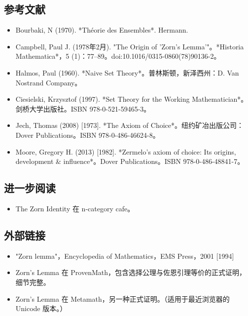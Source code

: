\subsection{参考文献}  
\begin{itemize}
\item Bourbaki, N (1970). *Théorie des Ensembles*. Hermann.  
\item Campbell, Paul J. (1978年2月). "The Origin of 'Zorn's Lemma'"。*Historia Mathematica*，5 (1)：77–89。doi:10.1016/0315-0860(78)90136-2。  
\item Halmos, Paul (1960). *Naive Set Theory*。普林斯顿，新泽西州：D. Van Nostrand Company。  
\item Ciesielski, Krzysztof (1997). *Set Theory for the Working Mathematician*。剑桥大学出版社。ISBN 978-0-521-59465-3。  
\item Jech, Thomas (2008) [1973]. *The Axiom of Choice*。纽约矿冶出版公司：Dover Publications。ISBN 978-0-486-46624-8。  
\item Moore, Gregory H. (2013) [1982]. *Zermelo's axiom of choice: Its origins, development & influence*。Dover Publications。ISBN 978-0-486-48841-7。
\end{itemize}  
\subsection{进一步阅读} 
\begin{itemize}
\item The Zorn Identity 在 n-category cafe。 
\end{itemize} 
\subsection{外部链接}  
\begin{itemize}
\item "Zorn lemma"，Encyclopedia of Mathematics，EMS Press，2001 [1994]  
\item Zorn's Lemma 在 ProvenMath，包含选择公理与佐恩引理等价的正式证明，细节完整。  
\item Zorn's Lemma 在 Metamath，另一种正式证明。（适用于最近浏览器的 Unicode 版本。）
\end{itemize}